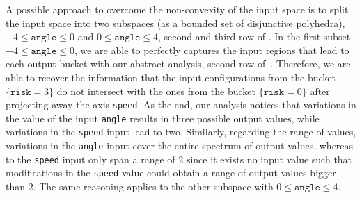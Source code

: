 A possible approach to overcome the non-convexity of the input space is to split the input space into two subspaces (as a bounded set of disjunctive polyhedra), $-4 \le \texttt{angle} \le 0$ and $0 \le \texttt{angle} \le 4$, second and third row of .
In the first subset $-4 \le \texttt{angle} \le 0$, we are able to perfectly captures the input regions that lead to each output bucket with our abstract analysis, second row of~.
Therefore, we are able to recover the information that the input configurations from the bucket $\{\texttt{risk} =3\}$ do not intersect with the ones from the bucket $\{\texttt{risk} = 0\}$ after projecting away the axis \texttt{speed}.
As the end, our analysis notices that variations in the value of the input \texttt{angle} results in three possible output values, while variations in the \texttt{speed} input lead to two.
Similarly, regarding the range of values, variations in the \texttt{angle} input cover the entire spectrum of output values, whereas to the \texttt{speed} input only span a range of 2 since it exists no input value such that modifications in the \texttt{speed} value could obtain a range of output values bigger than 2.
The same reasoning applies to the other subspace with $0 \le \texttt{angle} \le 4$.



